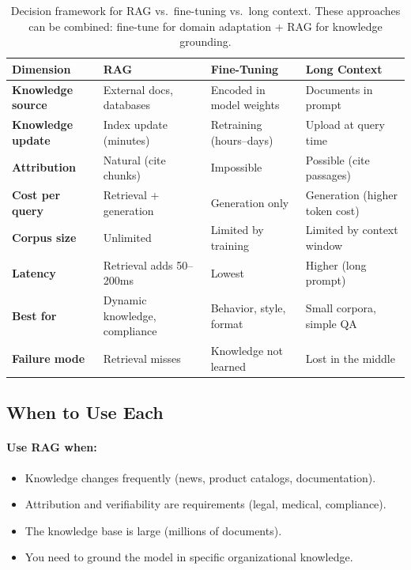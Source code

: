 \begin{table}[H]
\centering
\small
\begin{tabularx}{\textwidth}{@{}l X X X@{}}
\toprule
\textbf{Dimension} & \textbf{RAG} & \textbf{Fine-Tuning} & \textbf{Long Context} \\
\midrule
\textbf{Knowledge source} & External docs, databases & Encoded in model weights & Documents in prompt \\
\textbf{Knowledge update} & Index update (minutes) & Retraining (hours--days) & Upload at query time \\
\textbf{Attribution} & Natural (cite chunks) & Impossible & Possible (cite passages) \\
\textbf{Cost per query} & Retrieval + generation & Generation only & Generation (higher token cost) \\
\textbf{Corpus size} & Unlimited & Limited by training & Limited by context window \\
\textbf{Latency} & Retrieval adds 50--200ms & Lowest & Higher (long prompt) \\
\textbf{Best for} & Dynamic knowledge, compliance & Behavior, style, format & Small corpora, simple QA \\
\textbf{Failure mode} & Retrieval misses & Knowledge not learned & Lost in the middle \\
\bottomrule
\end{tabularx}
\caption{Decision framework for RAG vs.\ fine-tuning vs.\ long context.
These approaches can be combined: fine-tune for domain adaptation + RAG for
knowledge grounding.}
\label{tab:rag-vs-ft}
\end{table}

\subsection{When to Use Each}

\paragraph{Use RAG when:}
\begin{itemize}
    \item Knowledge changes frequently (news, product catalogs, documentation).
    \item Attribution and verifiability are requirements (legal, medical, compliance).
    \item The knowledge base is large (millions of documents).
    \item You need to ground the model in specific organizational knowledge.
\end{itemize}

